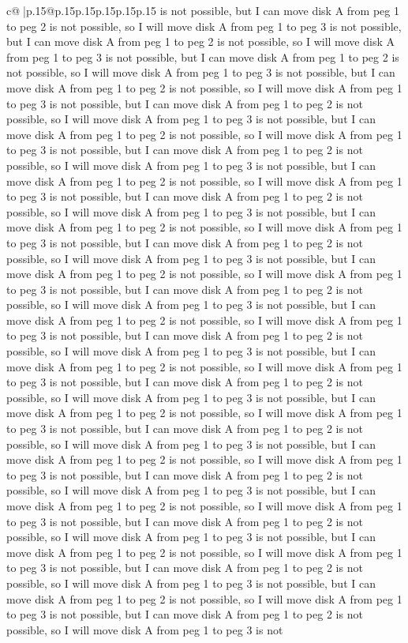 \documentclass{article}
\begin{document}
{\begin{supertabular}{c@{$\;$}|p{.15\linewidth}@{}p{.15\linewidth}p{.15\linewidth}p{.15\linewidth}p{.15\linewidth}p{.15\linewidth}}
{{{is not possible, but I can move disk A from peg 1 to peg 2 is not possible, so I will move disk A from peg 1 to peg 3 is not possible, but I can move disk A from peg 1 to peg 2 is not possible, so I will move disk A from peg 1 to peg 3 is not possible, but I can move disk A from peg 1 to peg 2 is not possible, so I will move disk A from peg 1 to peg 3 is not possible, but I can move disk A from peg 1 to peg 2 is not possible, so I will move disk A from peg 1 to peg 3 is not possible, but I can move disk A from peg 1 to peg 2 is not possible, so I will move disk A from peg 1 to peg 3 is not possible, but I can move disk A from peg 1 to peg 2 is not possible, so I will move disk A from peg 1 to peg 3 is not possible, but I can move disk A from peg 1 to peg 2 is not possible, so I will move disk A from peg 1 to peg 3 is not possible, but I can move disk A from peg 1 to peg 2 is not possible, so I will move disk A from peg 1 to peg 3 is not possible, but I can move disk A from peg 1 to peg 2 is not possible, so I will move disk A from peg 1 to peg 3 is not possible, but I can move disk A from peg 1 to peg 2 is not possible, so I will move disk A from peg 1 to peg 3 is not possible, but I can move disk A from peg 1 to peg 2 is not possible, so I will move disk A from peg 1 to peg 3 is not possible, but I can move disk A from peg 1 to peg 2 is not possible, so I will move disk A from peg 1 to peg 3 is not possible, but I can move disk A from peg 1 to peg 2 is not possible, so I will move disk A from peg 1 to peg 3 is not possible, but I can move disk A from peg 1 to peg 2 is not possible, so I will move disk A from peg 1 to peg 3 is not possible, but I can move disk A from peg 1 to peg 2 is not possible, so I will move disk A from peg 1 to peg 3 is not possible, but I can move disk A from peg 1 to peg 2 is not possible, so I will move disk A from peg 1 to peg 3 is not possible, but I can move disk A from peg 1 to peg 2 is not possible, so I will move disk A from peg 1 to peg 3 is not possible, but I can move disk A from peg 1 to peg 2 is not possible, so I will move disk A from peg 1 to peg 3 is not possible, but I can move disk A from peg 1 to peg 2 is not possible, so I will move disk A from peg 1 to peg 3 is not possible, but I can move disk A from peg 1 to peg 2 is not possible, so I will move disk A from peg 1 to peg 3 is not possible, but I can move disk A from peg 1 to peg 2 is not possible, so I will move disk A from peg 1 to peg 3 is not possible, but I can move disk A from peg 1 to peg 2 is not possible, so I will move disk A from peg 1 to peg 3 is not possible, but I can move disk A from peg 1 to peg 2 is not possible, so I will move disk A from peg 1 to peg 3 is not possible, but I can move disk A from peg 1 to peg 2 is not possible, so I will move disk A from peg 1 to peg 3 is not possible, but I can move disk A from peg 1 to peg 2 is not possible, so I will move disk A from peg 1 to peg 3 is not possible, but I can move disk A from peg 1 to peg 2 is not possible, so I will move disk A from peg 1 to peg 3 is not possible, but I can move disk A from peg 1 to peg 2 is not possible, so I will move disk A from peg 1 to peg 3 is not }}}
\end{supertabular}}
\end{document}

